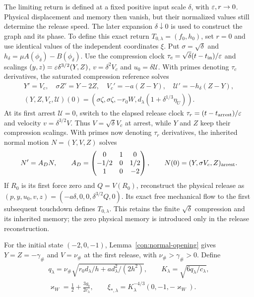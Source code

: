 The limiting return is defined at a fixed positive input scale
$\delta$, with $\varepsilon,r\to0$. Physical displacement and memory then
vanish, but their normalized values still determine the release speed.
The later expansion $\delta\downarrow0$ is used to construct the graph
and its phase. To define this exact return $T_{0,\lambda}=(f_0,h_0)$,
set $r=0$ and use identical values of the independent coordinates $\xi$.
Put $\sigma=\sqrt\delta$ and
$h_\delta=\mu A(\phi_\delta)-B(\phi_\delta)$.
Use the compression clock $\tau_c=\sqrt\delta(t-t_{\rm in})/\varepsilon$
and scalings $(y,z)=\varepsilon\delta^{3/2}(Y,Z)$, $v=\delta^2V_c$
and $u_0=\delta\mathcal U$.
With primes denoting $\tau_c$ derivatives, the saturated compression
reference solves
\begin{equation}
 \begin{gathered}
 Y'=V_c,\quad \sigma Z'=Y-2Z,\quad
 V_c'=-a(Z-Y),\quad \mathcal U'=-h_\delta(Z-Y),\\
 (Y,Z,V_c,\mathcal U)(0)=
 (\sigma\zeta,\sigma\zeta,-r_0W,
            d_\lambda(1+\delta^{1/3}\eta_U)).
 \label{loc:compression}
 \end{gathered}
\end{equation}
At its first arrest $\mathcal U=0$, switch to the elapsed release
clock $\tau_r=(t-t_{\rm arrest})/\varepsilon$ and velocity
$v=\delta^{3/2}V$. Thus $V=\sqrt\delta V_c$ at arrest, while
$Y$ and $Z$ keep their compression scalings. With primes now denoting
$\tau_r$ derivatives, the inherited normal motion $N=(Y,V,Z)$ solves
\begin{equation}
 N'=A_DN,\qquad
 A_D=\begin{pmatrix}0&1&0\\-1/2&0&1/2\\1&0&-2\end{pmatrix},
 \qquad N(0)=(Y,\sigma V_c,Z)_{\rm arrest}.
 \label{loc:normal-reference}
\end{equation}
If $R_0$ is its first force zero and $Q=V(R_0)$, reconstruct the
physical release as
$(p,y,u_0,v,z)=(-a\delta,0,0,\delta^{3/2}Q,0)$.
Its exact free mechanical flow to the first subsequent touchdown
defines $T_{0,\lambda}$. This retains the finite $\sqrt\delta$
compression and its inherited memory; the zero physical memory is
introduced only in the release reconstruction.

For the initial state $(-2,0,-1)$,
Lemma~\ref{con:normal-opening} gives $Y=Z=-\gamma_\#$ and
$V=\nu_\#$ at the first release, with
$\nu_\#>\gamma_\#>0$. Define
\begin{equation}
 \begin{gathered}
 q_\lambda=\nu_\#\sqrt{r_0d_\lambda/h+ad_\lambda^2/(2h^2)},
 \qquad K_\lambda=\sqrt{6q_\lambda/c_\lambda},\\
 \varkappa_W=\tfrac12+\frac{3g_b}{2c_\lambda},\qquad
 \xi_{*,\lambda}=K_\lambda^{-4/3}(0,-1,-\varkappa_W).
 \label{loc:constants}
 \end{gathered}
\end{equation}

